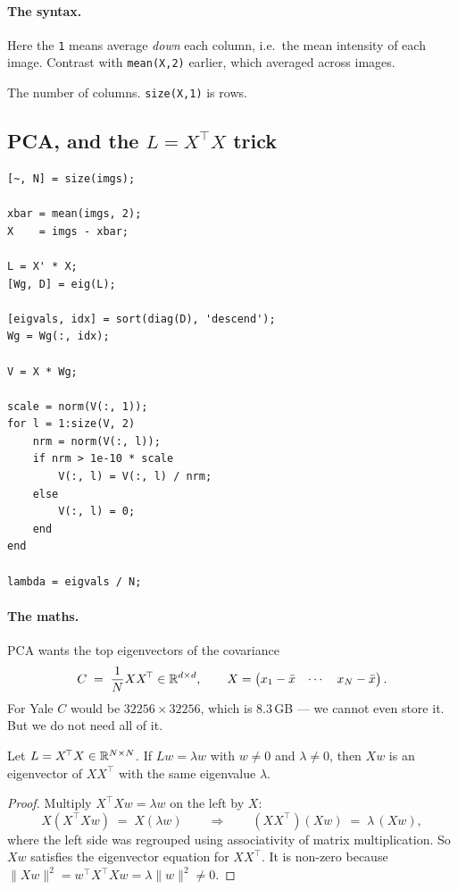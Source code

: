 \paragraph{The syntax.}
\begin{description}[leftmargin=*,style=nextline,nosep]
\item[\texttt{mean(X,1)}] Here the \texttt{1} means average \emph{down} each
  column, i.e.\ the mean intensity of each image. Contrast with
  \texttt{mean(X,2)} earlier, which averaged across images.
\item[\texttt{size(X,2)}] The number of columns. \texttt{size(X,1)} is rows.
\end{description}

\subsection{PCA, and the \texorpdfstring{$L = X^{\!\top}X$}{L = X'X} trick}
\label{sec:pcafn}

\begin{lstlisting}
[~, N] = size(imgs);

xbar = mean(imgs, 2);
X    = imgs - xbar;

L = X' * X;
[Wg, D] = eig(L);

[eigvals, idx] = sort(diag(D), 'descend');
Wg = Wg(:, idx);

V = X * Wg;

scale = norm(V(:, 1));
for l = 1:size(V, 2)
    nrm = norm(V(:, l));
    if nrm > 1e-10 * scale
        V(:, l) = V(:, l) / nrm;
    else
        V(:, l) = 0;
    end
end

lambda = eigvals / N;
\end{lstlisting}

\paragraph{The maths.} PCA wants the top eigenvectors of the covariance
\[
  C \;=\; \frac{1}{N}XX^{\!\top} \in \mathbb{R}^{d\times d},
  \qquad X = \begin{pmatrix}x_1 - \bar x & \cdots & x_N - \bar x\end{pmatrix}.
\]
For Yale $C$ would be $32256\times32256$, which is $8.3$\,GB --- we cannot even
store it. But we do not need all of it.

\begin{theorem}
Let $L = X^{\!\top}X \in \mathbb{R}^{N\times N}$. If $Lw = \lambda w$ with $w \neq 0$
and $\lambda \neq 0$, then $Xw$ is an eigenvector of $XX^{\!\top}$ with the same
eigenvalue $\lambda$.
\end{theorem}
\begin{proof}
Multiply $X^{\!\top}Xw = \lambda w$ on the left by $X$:
\[
  X(X^{\!\top}Xw) \;=\; X(\lambda w)
  \qquad\Longrightarrow\qquad
  (XX^{\!\top})(Xw) \;=\; \lambda\,(Xw),
\]
where the left side was regrouped using associativity of matrix
multiplication. So $Xw$ satisfies the eigenvector equation for $XX^{\!\top}$.
It is non-zero because $\|Xw\|^2 = w^{\!\top}X^{\!\top}Xw = \lambda\|w\|^2 \neq 0$.
\end{proof}

